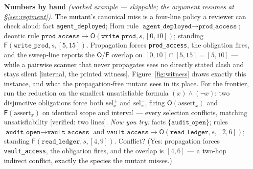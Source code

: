 \documentclass[11pt,a4paper]{article}
\newcommand{\Ob}{\mathsf{O}}
\newcommand{\Fb}{\mathsf{F}}
\begin{document}
\begin{worked}
\noindent\textbf{Numbers by hand} \emph{(worked example --- skippable; the argument resumes at \S\ref{sec:regiment}).} The
mutant's canonical miss is a four-line policy a reviewer can check aloud: fact
\texttt{agent\_deployed}; Horn rule $\texttt{agent\_deployed} \to \texttt{prod\_access}$; deontic rule $\texttt{prod\_access} \to
\Ob(\texttt{write\_prod}, s, [0,10])$; standing $\Fb(\texttt{write\_prod}, s, [5,15])$. Propagation forces
\texttt{prod\_access}, the obligation fires, and the sweep-line reports the $\Ob$/$\Fb$ overlap on $[0,10]\cap[5,15]=[5,10]$ ---
while a pairwise scanner that never propagates sees no directly stated clash and stays silent [internal, the printed witness].
Figure~\ref{fig:witness} draws exactly this instance, and what the propagation-free mutant sees in its place.
For the frontier, run the reduction on the smallest unsatisfiable formula $(x)\wedge(\neg x)$: two disjunctive obligations force
both $\mathrm{sel}_x^{+}$ and $\mathrm{sel}_x^{-}$, firing $\Ob(\mathrm{assert}_x)$ and $\Fb(\mathrm{assert}_x)$ on identical
scope and interval --- every selection conflicts, matching unsatisfiability [verified: two lines]. \emph{Now you try:} facts
$\{\texttt{audit\_open}\}$; rules $\texttt{audit\_open} \to \texttt{vault\_access}$ and $\texttt{vault\_access} \to
\Ob(\texttt{read\_ledger}, s, [2,6])$; standing $\Fb(\texttt{read\_ledger}, s, [4,9])$. Conflict? (Yes: propagation forces
\texttt{vault\_access}, the obligation fires, and the overlap is $[4,6]$ --- a two-hop indirect conflict, exactly the species the
mutant misses.)
\end{worked}


\end{document}
